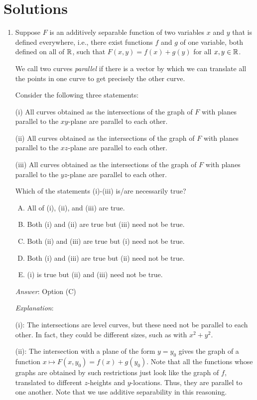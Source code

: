 \documentclass[10pt]{amsart}
\begin{document}
\section{Solutions}
\begin{enumerate}
\item Suppose $F$ is an additively separable function of two variables
  $x$ and $y$ that is defined everywhere, i.e., there exist functions
  $f$ and $g$ of one variable, both defined on all of $\mathbb{R}$, such that
  $F(x,y) = f(x) + g(y)$ for all $x,y \in \mathbb{R}$.
 
  We call two curves {\em parallel} if there is a vector by which we
  can translate all the points in one curve to get precisely the other
  curve.

  Consider the following three statements:

  (i) All curves obtained as the intersections of the graph of $F$
  with planes parallel to the $xy$-plane are parallel to each other.

  (ii) All curves obtained as the intersections of the graph of $F$
  with planes parallel to the $xz$-plane are parallel to each other.

  (iii) All curves obtained as the intersections of the graph of $F$
  with planes parallel to the $yz$-plane are parallel to each other.

  Which of the statements (i)-(iii) is/are necessarily true?

  \begin{enumerate}[(A)]
  \item All of (i), (ii), and (iii) are true.
  \item Both (i) and (ii) are true but (iii) need not be true.
  \item Both (ii) and (iii) are true but (i) need not be true.
  \item Both (i) and (iii) are true but (ii) need not be true.
  \item (i) is true but (ii) and (iii) need not be true.
  \end{enumerate}

  {\em Answer}: Option (C)

  {\em Explanation}: 

  (i): The intersections are level curves, but these need not be
  parallel to each other. In fact, they could be different sizes, such
  as with $x^2 + y^2$.

  (ii): The intersection with a plane of the form $y = y_0$ gives the
  graph of a function $x \mapsto F(x,y_0) = f(x) + g(y_0)$. Note that
  all the functions whose graphs are obtained by such restrictions
  just look like the graph of $f$, translated to different $z$-heights
  and $y$-locations. Thus, they are parallel to one another. Note that
  we use additive separability in this reasoning.


\end{enumerate}
\end{document}
